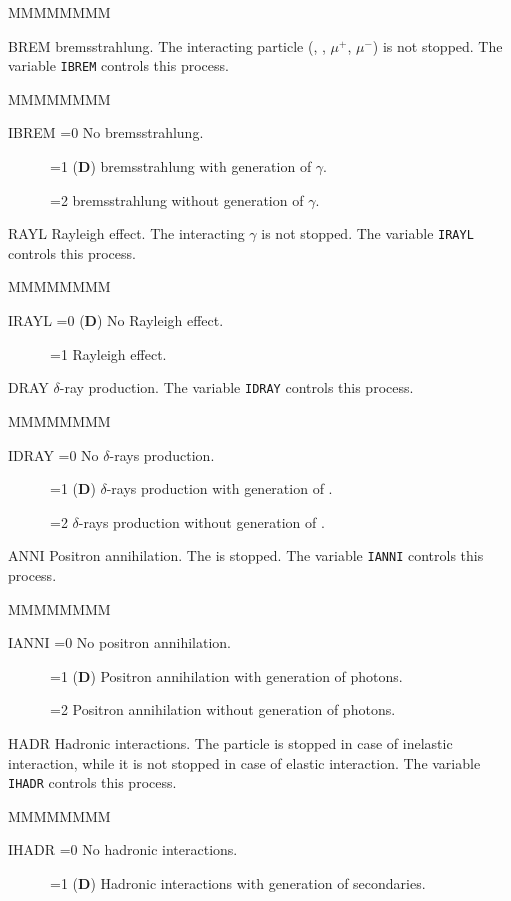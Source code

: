 \begin{DLtt}{MMMMMMMM}
\item[BREM] bremsstrahlung. The interacting particle (\Pem, \Pep, $\mu^{+}$,
$\mu^{-}$) is not stopped.
The variable {\tt IBREM} controls this process.
\begin{DLtt}{MMMMMMMM}
\item[IBREM =0] No bremsstrahlung.
\item[~~~~~~=1] ({\bf D}) bremsstrahlung with generation of $\gamma$.
\item[~~~~~~=2] bremsstrahlung without generation of $\gamma$.
\end{DLtt}
\item[RAYL] Rayleigh effect. The interacting $\gamma$ is not stopped.
The variable {\tt IRAYL} controls this process.
\begin{DLtt}{MMMMMMMM}
\item[IRAYL =0] ({\bf D}) No Rayleigh effect.
\item[~~~~~~=1] Rayleigh effect.
\end{DLtt}
\item[DRAY] $\delta$-ray production. 
The variable {\tt IDRAY} controls this process.
\begin{DLtt}{MMMMMMMM}
\item[IDRAY =0] No $\delta$-rays production.
\item[~~~~~~=1] ({\bf D}) $\delta$-rays production with generation of \Pem.
\item[~~~~~~=2] $\delta$-rays production without generation of \Pem.
\end{DLtt}
\item[ANNI] Positron annihilation. The \Pep is stopped.
The variable {\tt IANNI} controls this process.
\begin{DLtt}{MMMMMMMM}
\item[IANNI =0] No positron annihilation.
\item[~~~~~~=1] ({\bf D}) Positron annihilation with generation of photons.
\item[~~~~~~=2] Positron annihilation without generation of photons.
\end{DLtt}
\item[HADR] Hadronic interactions. The particle is stopped in case of
inelastic interaction, while it is not stopped in case of elastic interaction.
The variable {\tt IHADR} controls this process.
\begin{DLtt}{MMMMMMMM}
\item[IHADR =0] No hadronic interactions.
\item[~~~~~~=1] ({\bf D}) Hadronic interactions with generation of secondaries.

\end{DLtt}
\end{DLtt}
